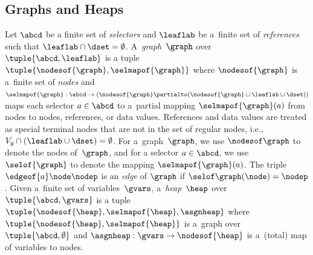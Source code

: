 
\subsection*{Graphs and Heaps}


Let $\abcd$ be a finite set of \emph{selectors} and $\leaflab$ be a~finite set
of \emph{references} such that $\leaflab \cap \dset = \emptyset$.
A~\emph{graph}~$\graph$ over $\tuple{\abcd,\leaflab}$ is
a tuple $\tuple{\nodesof{\graph},\selmapof{\graph}}$ where
$\nodesof{\graph}$ is a~finite set  of \emph{nodes} and $\selmapof{\graph}: \abcd \to (\nodesof{\graph}
\partialto (\nodesof{\graph}\cup \leaflab \cup \dset))$ maps each selector $a \in \abcd$
to a~partial mapping $\selmapof{\graph}(a)$ from nodes to nodes, references, or
data values.
%
References and data values are treated as special terminal
nodes that are not in the set of regular nodes, i.e., $V_g \cap (\leaflab \cup
\dset) = \emptyset$.
%
For a~graph~$\graph$, we use $\nodesof \graph$ to denote the nodes of~$\graph$,
and for a selector $a \in \abcd$, we
use $\selof{\graph}$ to denote the mapping $\selmapof{\graph}(a)$.
%
The triple $\edgeof{a} \node \nodep$ is an \emph{edge} of $\graph$ if $\selof\graph(\node) = \nodep$. 
%
Given a~finite set of variables~$\gvars$,
a~\emph{heap}~$\heap$ over $\tuple{\abcd, \gvars}$ is
a tuple $\tuple{\nodesof{\heap},\selmapof{\heap}, \asgnheap}$ where
$\tuple{\nodesof{\heap}, \selmapof{\heap}}$ is a~graph over $\tuple{\abcd,
\emptyset}$ and $\asgnheap: \gvars \to \nodesof{\heap}$ is a~(total)
map of variables to nodes.



